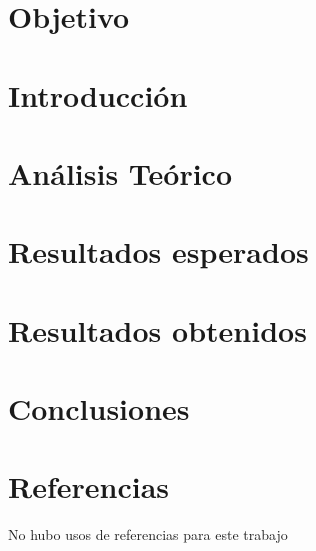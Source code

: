 \documentclass{article}
\begin{document}
\begin{abstract}
	\begin{justify}
		abstract
		Se aprendio y analizo el osciloscopio y el generador de funciones durante la sesion de laboratorio
		\end{justify}
{\it Keywords:}   función, botones 
\end{abstract}
\begin{multicols}{2}
\section{Objetivo}\label{Objetivo}

\section{Introducción}\label{sec:intro}

\section{Análisis Teórico}\label{sec:analiTeorico}

\section{Resultados esperados}\label{sec:resEsperados}

\section{Resultados obtenidos}\label{sec:resObtenidos}

\section{Conclusiones}\label{sec:conclusion}

\section*{Referencias}\label{sec:referencias}	
No hubo usos de referencias para este trabajo
\end{multicols}
\end{document}
